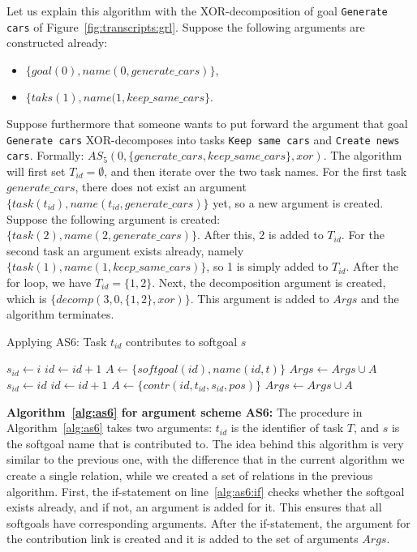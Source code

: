 Let us explain this algorithm with the XOR-decomposition of goal \texttt{Generate cars} of Figure~\ref{fig:transcripts:grl}. Suppose the following arguments are constructed already:
\begin{itemize}
\item $\{goal(0),name(0,generate\_cars)\},$
\item $\{taks(1),name(1,keep\_same\_cars\}.$
\end{itemize}
Suppose furthermore that someone wants to put forward the argument that goal \texttt{Generate cars} XOR-decomposes into tasks \texttt{Keep same cars} and \texttt{Create news cars}. Formally: $AS_5(0,\{generate\_cars,keep\_same\_cars\},xor)$. The algorithm will first set $T_{id}=\emptyset$, and then iterate over the two task names. For the first task $generate\_cars$, there does not exist an argument $\{task(t_{id}),name(t_{id},generate\_cars)\}$ yet, so a  new argument is created. Suppose the following argument is created: $\{task(2),name(2,generate\_cars)\}.$ After this, 2 is added to $T_{id}$. For the second task an argument exists already, namely $\{task(1),name(1,keep\_same\_cars)\}$, so 1 is simply added to $T_{id}$. After the for loop, we have $T_{id}=\{1,2\}$. Next, the decomposition argument is created, which is $\{decomp(3,0,\{1,2\},xor)\}$. This argument is added to $Args$ and the algorithm terminates.

\begin{algorithm}[h]
  \caption{Applying AS6: Task $t_{id}$ contributes to softgoal $s$}\label{alg:as6}
  \begin{algorithmic}[1]
     \label{alg:as6:if}
        \State $s_{id} \gets i$
    \Else
      \State $id\gets id+1$
      \State $A \gets \{softgoal(id),name(id,t)\}$
      \State $Args \gets Args\cup A$
      \State $s_{id} \gets id$
    \EndIf
    \State $id\gets id+1$
    \State $A\gets \{contr(id, t_{id}, s_{id}, pos)\}$
    \State $Args \gets Args\cup A$
    \EndProcedure
  \end{algorithmic}
\end{algorithm}

\noindent\textbf{Algorithm~\ref{alg:as6} for argument scheme AS6:} 
The procedure in Algorithm~\ref{alg:as6} takes two arguments: $t_{id}$ is the identifier of task $T$, and $s$ is the softgoal name that is contributed to. The idea behind this algorithm is very similar to the previous one, with the difference that in the current algorithm we create a single relation, while we created a set of relations in the previous algorithm. First, the if-statement on line~\ref{alg:as6:if} checks whether the softgoal exists already, and if not, an argument is added for it. This ensures that all softgoals have corresponding arguments. After the if-statement, the argument for the contribution link is created and it is added to the set of arguments $Args$. 


